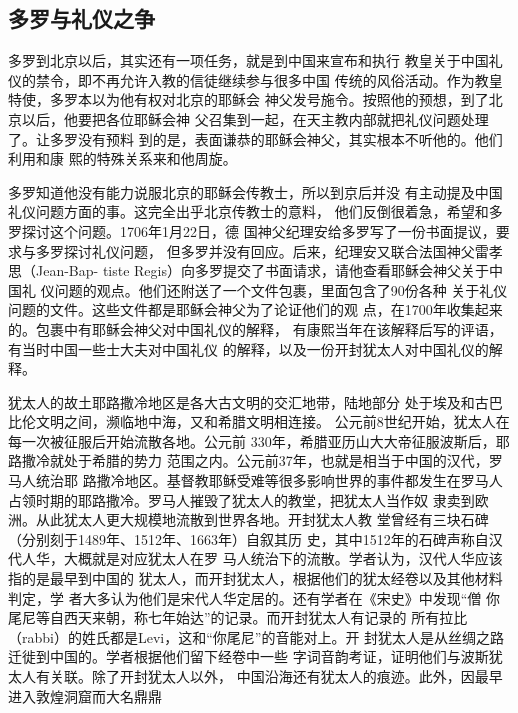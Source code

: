 \subsection{多罗与礼仪之争}
\par
多罗到北京以后，其实还有一项任务，就是到中国来宣布和执行%
教皇关于中国礼仪的禁令，即不再允许入教的信徒继续参与很多中国%
传统的风俗活动。作为教皇特使，多罗本以为他有权对北京的耶稣会%
神父发号施令。按照他的预想，到了北京以后，他要把各位耶稣会神%
父召集到一起，在天主教内部就把礼仪问题处理了。让多罗没有预料%
到的是，表面谦恭的耶稣会神父，其实根本不听他的。他们利用和康%
熙的特殊关系来和他周旋。%
\par
多罗知道他没有能力说服北京的耶稣会传教士，所以到京后并没%
有主动提及中国礼仪问题方面的事。这完全出乎北京传教士的意料，%
他们反倒很着急，希望和多罗探讨这个问题。1706年1月22日，德%
国神父纪理安给多罗写了一份书面提议，要求与多罗探讨礼仪问题，%
但多罗并没有回应。后来，纪理安又联合法国神父雷孝思（Jean-Bap-%
tiste Regis）向多罗提交了书面请求，请他查看耶稣会神父关于中国礼%
仪问题的观点。他们还附送了一个文件包裹，里面包含了90份各种%
关于礼仪问题的文件。这些文件都是耶稣会神父为了论证他们的观%
点，在1700年收集起来的。包裹中有耶稣会神父对中国礼仪的解释，%
有康熙当年在该解释后写的评语，有当时中国一些士大夫对中国礼仪%
的解释，以及一份开封犹太人对中国礼仪的解释。%
\par
犹太人的故土耶路撒冷地区是各大古文明的交汇地带，陆地部分%
处于埃及和古巴比伦文明之间，濒临地中海，又和希腊文明相连接。%
公元前8世纪开始，犹太人在每一次被征服后开始流散各地。公元前%
330年，希腊亚历山大大帝征服波斯后，耶路撒冷就处于希腊的势力%
范围之内。公元前37年，也就是相当于中国的汉代，罗马人统治耶%
路撒冷地区。基督教耶稣受难等很多影响世界的事件都发生在罗马人%
占领时期的耶路撒冷。罗马人摧毁了犹太人的教堂，把犹太人当作奴%
隶卖到欧洲。从此犹太人更大规模地流散到世界各地。开封犹太人教%
堂曾经有三块石碑（分别刻于1489年、1512年、1663年）自叙其历%
史，其中1512年的石碑声称自汉代人华，大概就是对应犹太人在罗%
马人统治下的流散。学者认为，汉代人华应该指的是最早到中国的%
犹太人，而开封犹太人，根据他们的犹太经卷以及其他材料判定，学%
者大多认为他们是宋代人华定居的。还有学者在《宋史》中发现“僧%
你尾尼等自西天来朝，称七年始达”的记录。而开封犹太人有记录的%
所有拉比（rabbi）的姓氏都是Levi，这和“你尾尼”的音能对上。开%
封犹太人是从丝绸之路迁徙到中国的。学者根据他们留下经卷中一些%
字词音韵考证，证明他们与波斯犹太人有关联。除了开封犹太人以外，%
中国沿海还有犹太人的痕迹。此外，因最早进入敦煌洞窟而大名鼎鼎%

